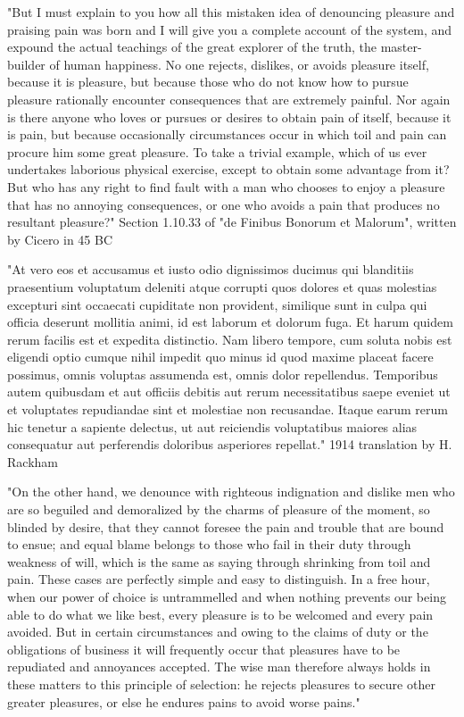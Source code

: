 \documentclass[10pt,landscape,a4paper]{article}
\begin{document}
\begin{multicols*}{4}
"But I must explain to you how all this mistaken idea of denouncing pleasure and praising pain was born and I will give you a complete account of the system, and expound the actual teachings of the great explorer of the truth, the master-builder of human happiness. No one rejects, dislikes, or avoids pleasure itself, because it is pleasure, but because those who do not know how to pursue pleasure rationally encounter consequences that are extremely painful. Nor again is there anyone who loves or pursues or desires to obtain pain of itself, because it is pain, but because occasionally circumstances occur in which toil and pain can procure him some great pleasure. To take a trivial example, which of us ever undertakes laborious physical exercise, except to obtain some advantage from it? But who has any right to find fault with a man who chooses to enjoy a pleasure that has no annoying consequences, or one who avoids a pain that produces no resultant pleasure?"
Section 1.10.33 of "de Finibus Bonorum et Malorum", written by Cicero in 45 BC

"At vero eos et accusamus et iusto odio dignissimos ducimus qui blanditiis praesentium voluptatum deleniti atque corrupti quos dolores et quas molestias excepturi sint occaecati cupiditate non provident, similique sunt in culpa qui officia deserunt mollitia animi, id est laborum et dolorum fuga. Et harum quidem rerum facilis est et expedita distinctio. Nam libero tempore, cum soluta nobis est eligendi optio cumque nihil impedit quo minus id quod maxime placeat facere possimus, omnis voluptas assumenda est, omnis dolor repellendus. Temporibus autem quibusdam et aut officiis debitis aut rerum necessitatibus saepe eveniet ut et voluptates repudiandae sint et molestiae non recusandae. Itaque earum rerum hic tenetur a sapiente delectus, ut aut reiciendis voluptatibus maiores alias consequatur aut perferendis doloribus asperiores repellat."
1914 translation by H. Rackham

"On the other hand, we denounce with righteous indignation and dislike men who are so beguiled and demoralized by the charms of pleasure of the moment, so blinded by desire, that they cannot foresee the pain and trouble that are bound to ensue; and equal blame belongs to those who fail in their duty through weakness of will, which is the same as saying through shrinking from toil and pain. These cases are perfectly simple and easy to distinguish. In a free hour, when our power of choice is untrammelled and when nothing prevents our being able to do what we like best, every pleasure is to be welcomed and every pain avoided. But in certain circumstances and owing to the claims of duty or the obligations of business it will frequently occur that pleasures have to be repudiated and annoyances accepted. The wise man therefore always holds in these matters to this principle of selection: he rejects pleasures to secure other greater pleasures, or else he endures pains to avoid worse pains."


\end{multicols*}
\end{document}

